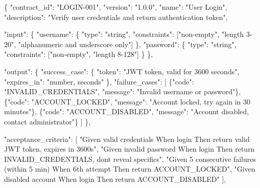 \documentclass[
]{article}
\newenvironment{Shaded}{}{}
\newcommand{\DataTypeTok}[1]{\textcolor[rgb]{0.56,0.13,0.00}{#1}}
\newcommand{\FunctionTok}[1]{\textcolor[rgb]{0.02,0.16,0.49}{#1}}
\newcommand{\OtherTok}[1]{\textcolor[rgb]{0.00,0.44,0.13}{#1}}
\newcommand{\StringTok}[1]{\textcolor[rgb]{0.25,0.44,0.63}{#1}}
\begin{document}
\begin{Shaded}
\begin{Highlighting}[]
\FunctionTok{\{}
  \DataTypeTok{"contract\_id"}\FunctionTok{:} \StringTok{"LOGIN{-}001"}\FunctionTok{,}
  \DataTypeTok{"version"}\FunctionTok{:} \StringTok{"1.0.0"}\FunctionTok{,}
  \DataTypeTok{"name"}\FunctionTok{:} \StringTok{"User Login"}\FunctionTok{,}
  \DataTypeTok{"description"}\FunctionTok{:} \StringTok{"Verify user credentials and return authentication token"}\FunctionTok{,}
  
  \DataTypeTok{"input"}\FunctionTok{:} \FunctionTok{\{}
    \DataTypeTok{"username"}\FunctionTok{:} \FunctionTok{\{}
      \DataTypeTok{"type"}\FunctionTok{:} \StringTok{"string"}\FunctionTok{,}
      \DataTypeTok{"constraints"}\FunctionTok{:} \OtherTok{[}\StringTok{"non{-}empty"}\OtherTok{,} \StringTok{"length 3{-}20"}\OtherTok{,} \StringTok{"alphanumeric and underscore only"}\OtherTok{]}
    \FunctionTok{\},}
    \DataTypeTok{"password"}\FunctionTok{:} \FunctionTok{\{}
      \DataTypeTok{"type"}\FunctionTok{:} \StringTok{"string"}\FunctionTok{,} 
      \DataTypeTok{"constraints"}\FunctionTok{:} \OtherTok{[}\StringTok{"non{-}empty"}\OtherTok{,} \StringTok{"length 8{-}128"}\OtherTok{]}
    \FunctionTok{\}}
  \FunctionTok{\},}
  
  \DataTypeTok{"output"}\FunctionTok{:} \FunctionTok{\{}
    \DataTypeTok{"success\_case"}\FunctionTok{:} \FunctionTok{\{}
      \DataTypeTok{"token"}\FunctionTok{:} \StringTok{"JWT token, valid for 3600 seconds"}\FunctionTok{,}
      \DataTypeTok{"expires\_in"}\FunctionTok{:} \StringTok{"number, seconds"}
    \FunctionTok{\},}
    \DataTypeTok{"failure\_cases"}\FunctionTok{:} \OtherTok{[}
      \FunctionTok{\{}\DataTypeTok{"code"}\FunctionTok{:} \StringTok{"INVALID\_CREDENTIALS"}\FunctionTok{,} \DataTypeTok{"message"}\FunctionTok{:} \StringTok{"Invalid username or password"}\FunctionTok{\}}\OtherTok{,}
      \FunctionTok{\{}\DataTypeTok{"code"}\FunctionTok{:} \StringTok{"ACCOUNT\_LOCKED"}\FunctionTok{,} \DataTypeTok{"message"}\FunctionTok{:} \StringTok{"Account locked, try again in 30 minutes"}\FunctionTok{\}}\OtherTok{,}
      \FunctionTok{\{}\DataTypeTok{"code"}\FunctionTok{:} \StringTok{"ACCOUNT\_DISABLED"}\FunctionTok{,} \DataTypeTok{"message"}\FunctionTok{:} \StringTok{"Account disabled, contact administrator"}\FunctionTok{\}}
    \OtherTok{]}
  \FunctionTok{\},}
  
  \DataTypeTok{"acceptance\_criteria"}\FunctionTok{:} \OtherTok{[}
    \StringTok{"Given valid credentials When login Then return valid JWT token, expires in 3600s"}\OtherTok{,}
    \StringTok{"Given invalid password When login Then return INVALID\_CREDENTIALS, don\textquotesingle{}t reveal specifics"}\OtherTok{,}
    \StringTok{"Given 5 consecutive failures (within 5 min) When 6th attempt Then return ACCOUNT\_LOCKED"}\OtherTok{,}
    \StringTok{"Given disabled account When login Then return ACCOUNT\_DISABLED"}
  \OtherTok{]}\FunctionTok{,}
  

\end{Highlighting}
\end{Shaded}
\end{document}
